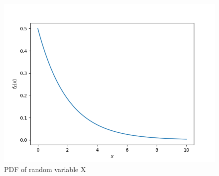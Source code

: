 \documentclass[journal,12pt,twocolumn]{IEEEtran}
\begin{document}
\begin{figure}[h]
\begin{center}
\includegraphics[scale=0.45]{Figure_1.png}
\end{center}
\caption{PDF of random variable X}\label{fig1}
\end{figure}
\end{document}
